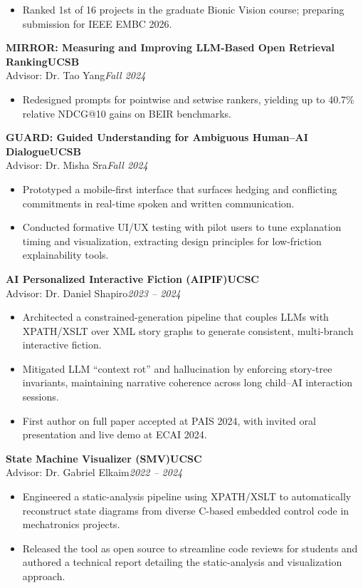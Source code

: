 \documentclass[11pt]{article}
\newcommand{\CVEntry}[4]{%
  \vspace{0.4em} %
  {\bfseries #1}\hfill {\bfseries #2}\\[0.1em] 
  #3\hfill \textit{#4}
}
\begin{document}
{\begin{itemize}
    \item Ranked 1st of 16 projects in the graduate Bionic Vision course; preparing submission for IEEE EMBC 2026.
  \end{itemize}
  \vspace{0.4em}
  \CVEntry
    {MIRROR: Measuring and Improving LLM-Based Open Retrieval Ranking}
    {UCSB}
    {Advisor: Dr. Tao Yang}
    {Fall 2024}
  \begin{itemize}
    \item Redesigned prompts for pointwise and setwise rankers, yielding up to 40.7\% relative NDCG@10 gains on BEIR benchmarks.
  \end{itemize}
  \vspace{0.4em}
  \CVEntry
    {GUARD: Guided Understanding for Ambiguous Human–AI Dialogue}
    {UCSB}
    {Advisor: Dr. Misha Sra}
    {Fall 2024}
  \begin{itemize}
    \item Prototyped a mobile-first interface that surfaces hedging and conflicting commitments in real-time spoken and written communication.
    \item Conducted formative UI/UX testing with pilot users to tune explanation timing and visualization, extracting design principles for low-friction explainability tools.
  \end{itemize}
  \vspace{0.4em}
  \CVEntry
    {AI Personalized Interactive Fiction (AIPIF)}
    {UCSC}
    {Advisor: Dr. Daniel Shapiro}
    {2023 -- 2024}
  \begin{itemize}
    \item Architected a constrained-generation pipeline that couples LLMs with XPATH/XSLT over XML story graphs to generate consistent, multi-branch interactive fiction.
    \item Mitigated LLM ``context rot'' and hallucination by enforcing story-tree invariants, maintaining narrative coherence across long child--AI interaction sessions.
    \item First author on full paper accepted at PAIS 2024, with invited oral presentation and live demo at ECAI 2024.
  \end{itemize}
  \newpage
  \noindent\CVEntry
    {State Machine Visualizer (SMV)}
    {UCSC}
    {Advisor: Dr. Gabriel Elkaim}
    {2022 -- 2024}
  \begin{itemize}
    \item Engineered a static-analysis pipeline using XPATH/XSLT to automatically reconstruct state diagrams from diverse C-based embedded control code in mechatronics projects.
    \item Released the tool as open source to streamline code reviews for students and authored a technical report detailing the static-analysis and visualization approach.
  \end{itemize}
}
\end{document}
